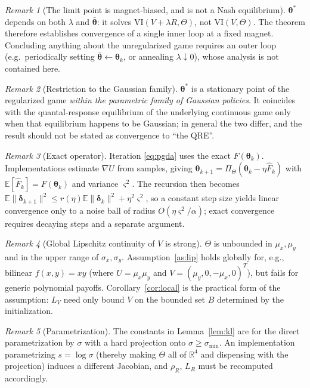 \documentclass{article}
\theoremstyle{definition}
\theoremstyle{remark}
\newtheorem{remark}{Remark}
\begin{document}
\begin{remark}[The limit point is magnet-biased, and is not a Nash equilibrium]
$\boldsymbol{\theta}^*$ depends on both $\lambda$ and $\bar{\boldsymbol{\theta}}$: it solves
$\mathrm{VI}(V + \lambda R, \Theta)$, not $\mathrm{VI}(V, \Theta)$. The theorem therefore establishes convergence
of a single inner loop at a fixed magnet. Concluding anything about the unregularized game requires an outer
loop (e.g.\ periodically setting $\bar{\boldsymbol{\theta}} \leftarrow \boldsymbol{\theta}_k$, or annealing
$\lambda \downarrow 0$), whose analysis is not contained here.
\end{remark}

\begin{remark}[Restriction to the Gaussian family]
$\boldsymbol{\theta}^*$ is a stationary point of the regularized game \emph{within the parametric family of
Gaussian policies}. It coincides with the quantal-response equilibrium of the underlying continuous game only
when that equilibrium happens to be Gaussian; in general the two differ, and the result should not be stated as
convergence to ``the QRE''.
\end{remark}

\begin{remark}[Exact operator]
Iteration \eqref{eq:pgda} uses the exact $F(\boldsymbol{\theta}_k)$. Implementations estimate
$\nabla U$ from samples, giving $\boldsymbol{\theta}_{k+1} = \Pi_\Theta(\boldsymbol{\theta}_k - \eta \widehat{F}_k)$
with $\mathbb{E}[\widehat{F}_k] = F(\boldsymbol{\theta}_k)$ and variance $\varsigma^{2}$. The recursion then becomes
$\mathbb{E}\|\boldsymbol{\delta}_{k+1}\|^{2} \le r(\eta) \mathbb{E}\|\boldsymbol{\delta}_k\|^{2} + \eta^{2}\varsigma^{2}$,
so a constant step size yields linear convergence only to a noise ball of radius
$O(\eta \varsigma^{2} / \alpha)$; exact convergence requires decaying steps and a separate argument.
\end{remark}

\begin{remark}[Global Lipschitz continuity of $V$ is strong]
$\Theta$ is unbounded in $\mu_x, \mu_y$ and in the upper range of $\sigma_x, \sigma_y$. Assumption~\ref{as:lip}
holds globally for, e.g., bilinear $f(x,y) = xy$ (where $U = \mu_x \mu_y$ and $V = (\mu_y, 0, -\mu_x, 0)^{T}$),
but fails for generic polynomial payoffs. Corollary~\ref{cor:local} is the practical form of the assumption:
$L_V$ need only bound $V$ on the bounded set $B$ determined by the initialization.
\end{remark}

\begin{remark}[Parametrization]
The constants in Lemma~\ref{lem:kl} are for the direct parametrization by $\sigma$ with a hard projection onto
$\sigma \ge \sigma_{\min}$. An implementation parametrizing $s = \log \sigma$ (thereby making $\Theta$ all of
$\mathbb{R}^4$ and dispensing with the projection) induces a different Jacobian, and $\rho_R$, $L_R$ must be
recomputed accordingly.
\end{remark}
\end{document}
